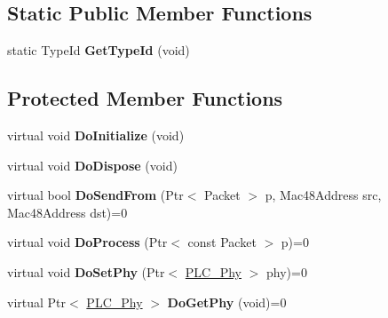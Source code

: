\subsection*{\-Static \-Public \-Member \-Functions}
\begin{DoxyCompactItemize}
\item 
\hypertarget{classns3_1_1PLC__Mac_a9cb375d159ef8f4f98ce5ccb71e0fc55}{static \-Type\-Id {\bfseries \-Get\-Type\-Id} (void)}\label{classns3_1_1PLC__Mac_a9cb375d159ef8f4f98ce5ccb71e0fc55}

\end{DoxyCompactItemize}
\subsection*{\-Protected \-Member \-Functions}
\begin{DoxyCompactItemize}
\item 
\hypertarget{classns3_1_1PLC__Mac_ade564ab18b54b5d839561c214f9c0304}{virtual void {\bfseries \-Do\-Initialize} (void)}\label{classns3_1_1PLC__Mac_ade564ab18b54b5d839561c214f9c0304}

\item 
\hypertarget{classns3_1_1PLC__Mac_aa7ee0e028804b882a8563c7a8784b3b3}{virtual void {\bfseries \-Do\-Dispose} (void)}\label{classns3_1_1PLC__Mac_aa7ee0e028804b882a8563c7a8784b3b3}

\item 
\hypertarget{classns3_1_1PLC__Mac_a059f2702bc117b2cb68732489b275962}{virtual bool {\bfseries \-Do\-Send\-From} (\-Ptr$<$ \-Packet $>$ p, \-Mac48\-Address src, \-Mac48\-Address dst)=0}\label{classns3_1_1PLC__Mac_a059f2702bc117b2cb68732489b275962}

\item 
\hypertarget{classns3_1_1PLC__Mac_a3a3165e888c70bf27e5c5f763a66b939}{virtual void {\bfseries \-Do\-Process} (\-Ptr$<$ const \-Packet $>$ p)=0}\label{classns3_1_1PLC__Mac_a3a3165e888c70bf27e5c5f763a66b939}

\item 
\hypertarget{classns3_1_1PLC__Mac_a7788ec2ccb628ceb70d1bc140917a42c}{virtual void {\bfseries \-Do\-Set\-Phy} (\-Ptr$<$ \hyperlink{classns3_1_1PLC__Phy}{\-P\-L\-C\-\_\-\-Phy} $>$ phy)=0}\label{classns3_1_1PLC__Mac_a7788ec2ccb628ceb70d1bc140917a42c}

\item 
\hypertarget{classns3_1_1PLC__Mac_a6e820429841dc8e9d764d8b42b6fbc53}{virtual \-Ptr$<$ \hyperlink{classns3_1_1PLC__Phy}{\-P\-L\-C\-\_\-\-Phy} $>$ {\bfseries \-Do\-Get\-Phy} (void)=0}\label{classns3_1_1PLC__Mac_a6e820429841dc8e9d764d8b42b6fbc53}

\end{DoxyCompactItemize}
